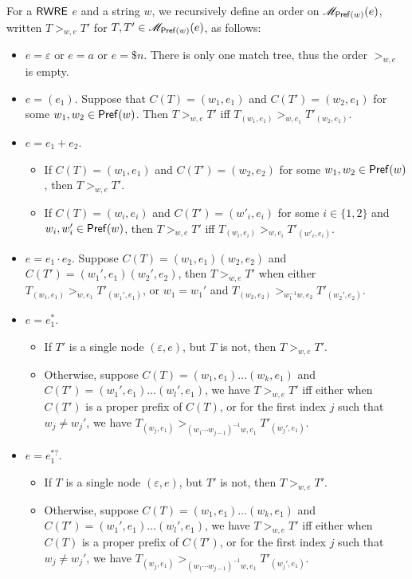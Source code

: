   
  \begin{definition}\label{def-regex-semantics}
  		
  	For a ${\sf RWRE}$ $e$ and a string $w$, we recursively define an order on $\mathscr{M}_{\mathsf{Pref}(w)}(e)$, written $T
  	>_{w,e} T'$ for $T, T' \in \mathscr{M}_{\mathsf{Pref}(w)}(e)$, as follows:
  	\begin{itemize}
  		\item $e = \varepsilon$ or $e = a$ or $e = \$ n$. There is only one match tree, thus the
  		order $>_{w, e}$ is empty.
  		
  		\item $e = (e_1)$. Suppose that $C (T) = (w_1, e_1)$ and $C (T') = (w_2, e_1)$ for some $w_1, w_2 \in \mathsf{Pref}(w)$.
  		Then $T >_{w,e} T'$ iff $T_{(w_1, e_1)} >_{w, e_1} T'_{(w_2, e_1)}$.
  		
  		\item $e = e_1 + e_2$.
  		\begin{itemize}
  			\item If $C (T) = (w_1, e_1)$ and $C (T') = (w_2, e_2)$ for some $w_1, w_2 \in \mathsf{Pref}(w)$, then $T >_{w,e} T'$.
%  			
  			\item If $C (T) = (w_i, e_i)$ and $C (T') = (w'_i, e_i)$ for some $i \in \{ 1,
  			2 \}$ and $w_i, w'_i \in \mathsf{Pref}(w)$, then $T >_{w,e} T'$ iff $T_{(w_i, e_i)} >_{w, e_i} T'_{(w'_i, e_i)}$.
  		\end{itemize}
  		\item $e = e_1 \cdot e_2$. Suppose $C (T) = (w_1, e_1) (w_2, e_2)$ and $C (T') =
  		(w_1', e_1) (w_2', e_2)$, then $T >_{w,e} T'$ when either $T_{(w_1, e_1)} >_{w, e_1}
  		T'_{(w_1', e_1)}$, or $w_1 = w_1'$ and $T_{(w_2, e_2)} >_{w_1^{-1}w, e_2} T'_{(w_2', e_2)}$.
%  		
  		\item $e = e_1^{\ast}$. 
		\begin{itemize}
		\item If $T' $ is  a single node $(\varepsilon, e)$, but $T$ is not, then $T >_{w, e} T'$.
  		\item Otherwise, suppose $C(T) = (w_1, e_1) \ldots (w_k, e_1)$ and $C (T') =
  		(w_1', e_1) \ldots (w_l', e_1)$, we have $T >_{w,e} T'$ iff either when $C (T')$
  		is a proper prefix of $C (T)$, or for the first index $j$ such that $w_j
  		\neq w_j'$, we have $T_{(w_j, e_1)} >_{(w_1\cdots w_{j-1})^{-1}w, e_1} T'_{(w_j', e_1)}$.
		\end{itemize}
%
  		\item $e = e_1^{\ast?}$. 
		\begin{itemize}
		\item If $T$ is  a single node  $(\varepsilon, e)$, but $T'$ is not, then $T >_{w, e} T'$.
  		\item Otherwise, suppose $C(T) = (w_1, e_1) \ldots (w_k, e_1)$ and $C (T') =
  		(w_1', e_1) \ldots (w_l', e_1)$, we have $T >_{w,e} T'$ iff either when $C (T)$
  		is a proper prefix of $C (T')$, or for the first index $j$ such that $w_j
  		\neq w_j'$, we have $T_{(w_j, e_1)} >_{(w_1\cdots w_{j-1})^{-1}w, e_1} T'_{(w_j', e_1)}$.
		\end{itemize}
  	\end{itemize}
  	

\end{definition}
